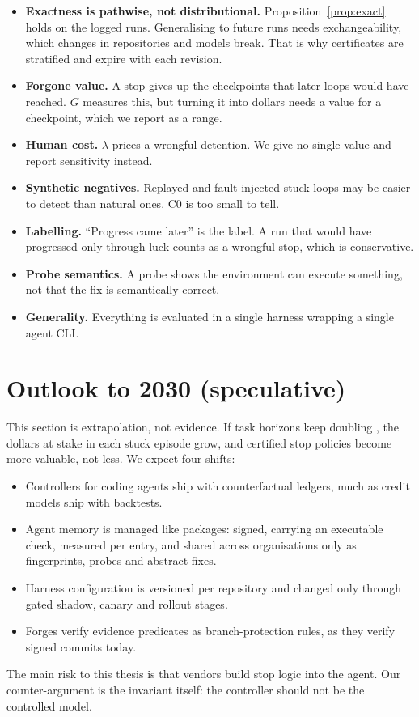 \documentclass[11pt]{article}
\theoremstyle{remark}
\begin{document}
\begin{itemize}[leftmargin=*]
\item \textbf{Exactness is pathwise, not distributional.} Proposition~\ref{prop:exact} holds on the logged runs. Generalising to future runs needs exchangeability, which changes in repositories and models break. That is why certificates are stratified and expire with each revision.
\item \textbf{Forgone value.} A stop gives up the checkpoints that later loops would have reached. $G$ measures this, but turning it into dollars needs a value for a checkpoint, which we report as a range.
\item \textbf{Human cost.} $\lambda$ prices a wrongful detention. We give no single value and report sensitivity instead.
\item \textbf{Synthetic negatives.} Replayed and fault-injected stuck loops may be easier to detect than natural ones. C0 is too small to tell.
\item \textbf{Labelling.} ``Progress came later'' is the label. A run that would have progressed only through luck counts as a wrongful stop, which is conservative.
\item \textbf{Probe semantics.} A probe shows the environment can execute something, not that the fix is semantically correct.
\item \textbf{Generality.} Everything is evaluated in a single harness wrapping a single agent CLI.
\end{itemize}

\section{Outlook to 2030 (speculative)}
\label{sec:outlook}

This section is extrapolation, not evidence. If task horizons keep doubling \citep{metr2025horizon}, the dollars at stake in each stuck episode grow, and certified stop policies become more valuable, not less. We expect four shifts:
\begin{itemize}[leftmargin=*,nosep]
\item Controllers for coding agents ship with counterfactual ledgers, much as credit models ship with backtests.
\item Agent memory is managed like packages: signed, carrying an executable check, measured per entry, and shared across organisations only as fingerprints, probes and abstract fixes.
\item Harness configuration is versioned per repository and changed only through gated shadow, canary and rollout stages.
\item Forges verify evidence predicates as branch-protection rules, as they verify signed commits today.
\end{itemize}
The main risk to this thesis is that vendors build stop logic into the agent. Our counter-argument is the invariant itself: the controller should not be the controlled model.
\end{document}
